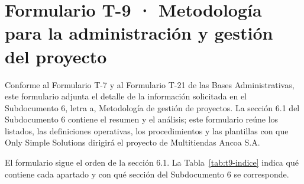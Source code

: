 \documentclass[11pt]{article}
\begin{document}
\renewcommand{\tablename}{Tabla}
\renewcommand{\thetable}{T-9.\arabic{table}}

\section{Formulario T-9 · Metodología para la administración y gestión del proyecto}\label{formulario-t-9}

Conforme al Formulario T-7 y al Formulario T-21 de las Bases Administrativas, este formulario adjunta el detalle de la información solicitada en el Subdocumento 6, letra a, Metodología de gestión de proyectos. La sección 6.1 del Subdocumento 6 contiene el resumen y el análisis; este formulario reúne los listados, las definiciones operativas, los procedimientos y las plantillas con que Only Simple Solutions dirigirá el proyecto de Multitiendas Ancoa S.A.

El formulario sigue el orden de la sección 6.1. La Tabla~\mbox{\ref{tab:t9-indice}} indica qué contiene cada apartado y con qué sección del Subdocumento 6 se corresponde.
\end{document}
